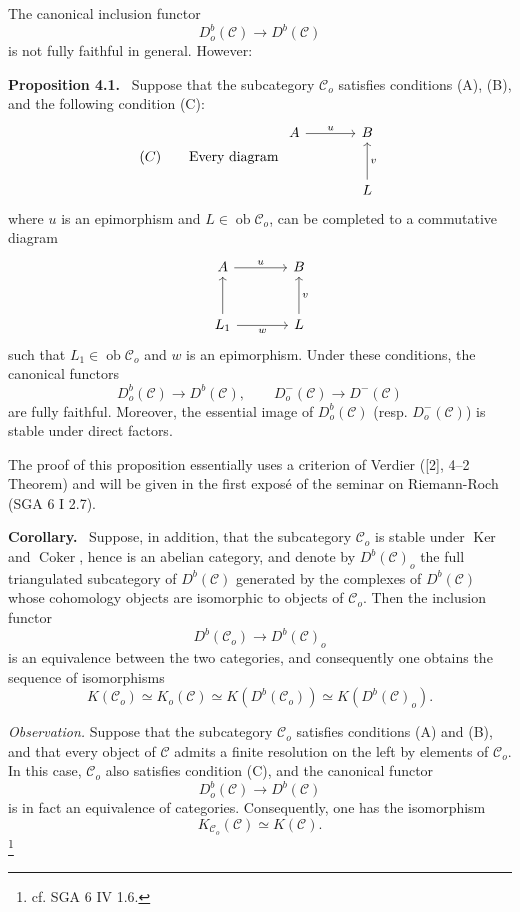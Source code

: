 \documentclass[11pt]{article}
\newenvironment{statement}[1]{\par\medskip\noindent\textbf{#1.}\ }{\par\medskip}
\providecommand{\Ker}{\operatorname{Ker}}
\providecommand{\Coker}{\operatorname{Coker}}
\providecommand{\Ob}{\operatorname{ob}}
\providecommand{\cC}{\mathcal C}
\providecommand{\Ker}{\operatorname{Ker}}
\providecommand{\Coker}{\operatorname{Coker}}
\providecommand{\Ker}{\operatorname{Ker}}
\providecommand{\Coker}{\operatorname{Coker}}
\providecommand{\Ob}{\operatorname{ob}}
\providecommand{\cC}{\mathcal C}
\providecommand{\Ob}{\operatorname{Ob}}
\begin{document}
The canonical inclusion functor
\[
D_o^b(\cC)\longrightarrow D^b(\cC)
\]
is not fully faithful in general. However:

\begin{statement}{Proposition 4.1}
Suppose that the subcategory $\cC_o$ satisfies conditions (A), (B), and the following condition (C):
\[
(C)\qquad
\text{Every diagram }
\begin{tikzcd}[column sep=large,row sep=large]
A \arrow[r,"u"]&B\\
&L \arrow[u,"v"']
\end{tikzcd}
\]
where $u$ is an epimorphism and $L\in\Ob\cC_o$, can be completed to a commutative diagram
\[
\begin{tikzcd}[column sep=large,row sep=large]
A \arrow[r,"u"]&B\\
L_1 \arrow[u] \arrow[r,"w"']&L \arrow[u,"v"']
\end{tikzcd}
\]
such that $L_1\in\Ob\cC_o$ and $w$ is an epimorphism. Under these conditions, the canonical functors
\[
D_o^b(\cC)\longrightarrow D^b(\cC),\qquad
D_o^-(\cC)\longrightarrow D^-(\cC)
\]
are fully faithful. Moreover, the essential image of $D_o^b(\cC)$ (resp. $D_o^-(\cC)$) is stable under direct factors.
\end{statement}

The proof of this proposition essentially uses a criterion of Verdier ([2], 4--2 Theorem) and will be given in the first exposé of the seminar on Riemann-Roch (SGA 6 I 2.7).

\begin{statement}{Corollary}
Suppose, in addition, that the subcategory $\cC_o$ is stable under $\Ker$ and $\Coker$, hence is an abelian category, and denote by $D^b(\cC)_o$ the full triangulated subcategory of $D^b(\cC)$ generated by the complexes of $D^b(\cC)$ whose cohomology objects are isomorphic to objects of $\cC_o$. Then the inclusion functor
\[
D^b(\cC_o)\longrightarrow D^b(\cC)_o
\]
is an equivalence between the two categories, and consequently one obtains the sequence of isomorphisms
\[
K(\cC_o)\simeq K_o(\cC)\simeq K(D^b(\cC_o))\simeq K(D^b(\cC)_o).
\tag{*}
\]
\end{statement}

\emph{Observation.} Suppose that the subcategory $\cC_o$ satisfies conditions (A) and (B), and that every object of $\cC$ admits a finite resolution on the left by elements of $\cC_o$. In this case, $\cC_o$ also satisfies condition (C), and the canonical functor
\[
D_o^b(\cC)\longrightarrow D^b(\cC)
\]
is in fact an equivalence of categories. Consequently, one has the isomorphism
\[
K_{\cC_o}(\cC)\simeq K(\cC).
\]
\footnote{cf. SGA 6 IV 1.6.}
\end{document}
